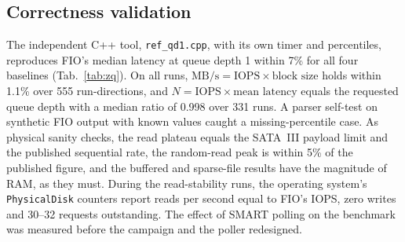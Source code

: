 \documentclass{article}
\begin{document}
\subsection{Correctness validation}\label{sec:valid}
The independent C++ tool, \texttt{ref\_qd1.cpp}, with its own timer and percentiles, reproduces FIO's median latency at queue depth 1 within 7\% for all four baselines (Tab.~\ref{tab:zq}). On all runs, $\text{MB/s}=\text{IOPS}\times\text{block size}$ holds within 1.1\% over 555 run-directions, and $N=\text{IOPS}\times\text{mean latency}$ equals the requested queue depth with a median ratio of 0.998 over 331 runs. A parser self-test on synthetic FIO output with known values caught a missing-percentile case. As physical sanity checks, the read plateau equals the SATA~III payload limit and the published sequential rate, the random-read peak is within 5\% of the published figure, and the buffered and sparse-file results have the magnitude of RAM, as they must. During the read-stability runs, the operating system's \texttt{PhysicalDisk} counters report reads per second equal to FIO's IOPS, zero writes and 30--32 requests outstanding. The effect of SMART polling on the benchmark was measured before the campaign and the poller redesigned.
\end{document}
